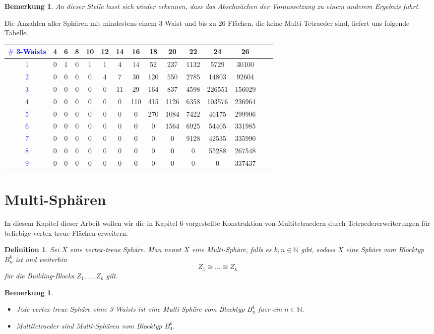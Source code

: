 \documentclass[12pt,titlepage,twoside,cleardoublepage]{article}
\theoremstyle{nummermitklammern}
\newtheorem{definition}[temp]{Definition}
\newtheorem{bemerkung}[temp]{Bemerkung}
\newtheorem{definition}[zahl]{Definition}
\newtheorem{bemerkung}[zahl]{Bemerkung}
\numberwithin{equation}{section}
\begin{document}
\begin{bemerkung}
An dieser Stelle lasst sich wieder erkennen, dass das Abschwächen
der Voraussetzung zu einem anderem Ergebnis fuhrt.
\end{bemerkung}
Die Anzahlen aller Sphären mit mindestens einem 3-Waist und bis zu 26 Flächen,
die keine Multi-Tetraeder sind, liefert uns folgende Tabelle.\\
\begin{tabular}{|c|c|c|c|c|c|c|c|c|c|c|c|c|c|c|}
\hline
\textcolor{blue}{$\#$ 3-Waists }&\textbf{4}& \textbf{6}& \textbf{8}& \textbf{10}& \textbf{12}& \textbf{14}& \textbf{16}& \textbf{18}& \textbf{20}& \textbf{22}& \textbf{24}& \textbf{26}\\
\hline
\textcolor{blue}{1} &0& 1& 0& 1& 1& 4& 14& 52& 237& 1132& 5729& 30100\\
\hline
\textcolor{blue}{2} &0& 0& 0 &0& 4& 7& 30& 120& 550& 2785& 14803& 92604\\
\hline
\textcolor{blue}{3}& 0& 0& 0& 0& 0& 11& 29& 164& 837& 4598& 226551& 156029\\
\hline
\textcolor{blue}{4}& 0& 0& 0& 0& 0& 0& 110& 415& 1126& 6358& 103576& 236964\\
\hline
\textcolor{blue}{5}& 0& 0& 0& 0& 0& 0& 0& 270& 1084& 7422& 46175& 299906\\
\hline
\textcolor{blue}{6} &0& 0& 0& 0& 0& 0& 0& 0 &1564& 6925& 54405& 331985\\
\hline
\textcolor{blue}{7}& 0& 0& 0& 0& 0& 0& 0& 0& 0& 9128& 42535& 335990\\
\hline
\textcolor{blue}{8}& 0& 0& 0& 0& 0& 0& 0& 0& 0& 0& 55288& 267548\\
\hline
\textcolor{blue}{9} &0& 0& 0& 0& 0& 0& 0& 0& 0& 0& 0& 337437\\
\hline
\end{tabular}
\section{Multi-Sphären}
In diesem Kapitel dieser Arbeit wollen wir die in Kapitel 6 vorgestellte Konstruktion von Multitetraedern durch Tetraedererweiterungen für beliebige vertex-treue Flächen erweitern.   
\begin{definition}
Sei $X$ eine vertex-treue Sphäre. Man nennt $X$ eine \emph{Multi-Sphäre}, falls es $k,n \in \mathbb{N}$ gibt, sodass $X$ eine Sphäre vom Blocktyp $B_n^k$ ist und weiterhin
\[
Z_1\cong \ldots\cong Z_k
\]
für die Building-Blocks $Z_1,\ldots,Z_k$ gilt. 
\end{definition}
\begin{bemerkung}
\begin{itemize}
\item Jede vertex-treue Sphäre ohne 3-Waists ist eine Multi-Sphäre vom Blocktyp $B_n^1$ fuer ein $n\in \mathbb{N}.$
\item Multitetraeder sind Multi-Sphären vom Blocktyp $B_4^k.$
\end{itemize}
\end{bemerkung}
\end{document}
